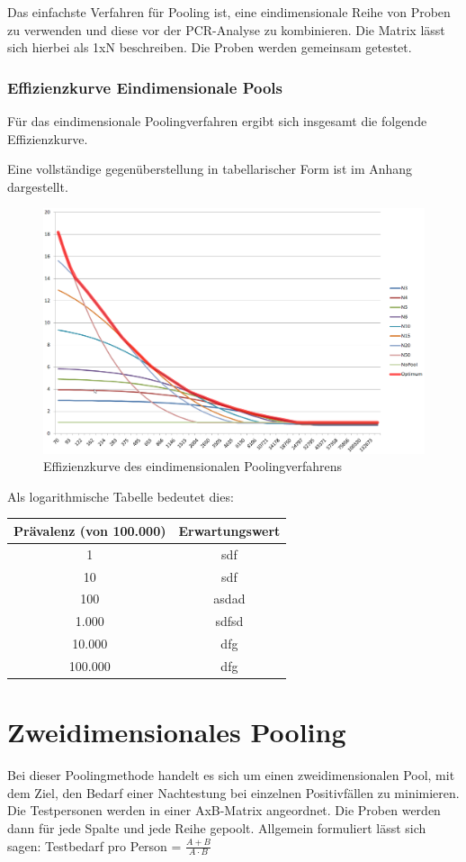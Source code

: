 Das einfachste Verfahren für Pooling ist, eine eindimensionale Reihe von Proben zu verwenden und diese vor der PCR-Analyse zu kombinieren.
Die Matrix lässt sich hierbei als 1xN beschreiben.
Die Proben werden gemeinsam getestet.
\cleardoublepage
\subsubsection{Effizienzkurve Eindimensionale Pools}
Für das eindimensionale Poolingverfahren ergibt sich insgesamt die folgende Effizienzkurve.

Eine vollständige gegenüberstellung in tabellarischer Form ist im Anhang dargestellt.
\begin{figure}[h]
	\centering
	\includegraphics[height=.6\textwidth]{img/1D_Pool-EffKurve}
	\caption{Effizienzkurve des eindimensionalen Poolingverfahrens\footnotemark}
\end{figure}

Als logarithmische Tabelle bedeutet dies:

\begin{tabular}{|c|c|}
	\hline
	Prävalenz (von 100.000) & Erwartungswert \\
	\hline
	1 & sdf \\
	\hline
	10 & sdf \\
	\hline
	100 & asdad \\
	\hline
	1.000 & sdfsd \\
	\hline
	10.000 & dfg \\
	\hline
	100.000 & dfg \\
	\hline
\end{tabular}

\cleardoublepage

\section{Zweidimensionales Pooling}
Bei dieser Poolingmethode handelt es sich um einen zweidimensionalen Pool, mit dem Ziel, den Bedarf einer Nachtestung bei einzelnen Positivfällen zu minimieren.
Die Testpersonen werden in einer AxB-Matrix angeordnet.
Die Proben werden dann für jede Spalte und jede Reihe gepoolt.
Allgemein formuliert lässt sich sagen:
Testbedarf pro Person =
$\frac{A+B}{A\cdot B}$

